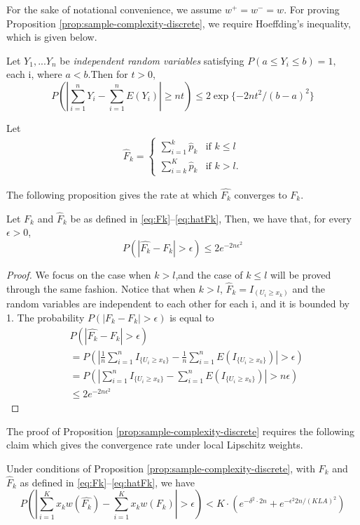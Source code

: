 For the sake of notational convenience, we assume $w^+=w^-=w$. 
For proving Proposition \ref{prop:sample-complexity-discrete}, we require Hoeffding's inequality, which is given below.
\begin{lemma}
Let $Y_1,...Y_n$ be \emph{independent random variables} satisfying $P(a\leq Y_i \leq b)= 1,$ each i, where $a<b.
$Then for $t>0$,
$$P(\left|\sum_{i=1}^n Y_i -\sum_{i=1}^n E(Y_i)\right| \geq nt ) \leq 2\exp{\{-2nt^2 /(b-a)^2\}} $$
\end{lemma}


Let
\begin{align}
\label{eq:hatFk}
\hat F_k = 
\begin{cases}
   \sum_{i=1}^k \hat p_k & \text{if   } k \leq l \\
   \sum_{i=k}^K \hat p_k & \text{if  }  k > l.
\end{cases}  
\end{align}

The following proposition gives the rate at which $\hat{F_k}$ converges to $F_k$.
\begin{proposition}
\label{prop:hoeffding-discrete}
Let $F_k$ and $\hat F_k$ be as defined in \eqref{eq:Fk}--\eqref{eq:hatFk}, Then, we have that, for every $\epsilon >0$, 
$$P(|\hat{F_k}-F_k| > \epsilon) \leq 2 e^{-2n \epsilon^2} $$
\end{proposition}
\begin{proof}
We focus on the case when $k > l$,and the case of $k \leq l$ will be proved through the same fashion.
Notice that when $k>l$,  $\hat F_k =I_{(U_i \geq  x_k) }$ and the random variables are independent to each other for each i, and it is bounded by 1. 
The probability $P(\left|F_k- F_k \right| > \epsilon)$ is equal to 
\begin{align*}
&
P(\left|\hat{F_k}- F_k \right| > \epsilon) \\ & = P(\left| \frac{1}{n} \sum_{i=1}^n I_{\{U_i \geq
x_k\}} - \frac{1}{n} \sum_{i=1}^n E(I_{\{U_i \geq x_k\}}) \right| > \epsilon) \\ & = P(\left|
\sum_{i=1}^n I_{\{U_i \geq x_k\}} - \sum_{i=1}^n E(I_{\{U_i \geq x_k\}}) \right| > n\epsilon) \\ &
    \leq 2e^{-2n \epsilon^2}
\end{align*}
\end{proof}

The proof of Proposition \ref{prop:sample-complexity-discrete} requires the following claim which gives the convergence rate under local Lipschitz weights. 
\begin{proposition}
\label{prop:discrete-first-term}
Under conditions of Proposition \ref{prop:sample-complexity-discrete}, with $F_k$ and $\hat F_k$ as defined in \eqref{eq:Fk}--\eqref{eq:hatFk},  we have
$$P(\left| \sum_{i=1}^K x_k w(\hat{F_k}) - \sum_{i=1}^K x_k w(F_k) \right| >\epsilon) < K\cdot (
e^{-\delta^2\cdot 2n} + e^{-\epsilon^2 2n/(KLA)^2}) $$ 
\end{proposition}

